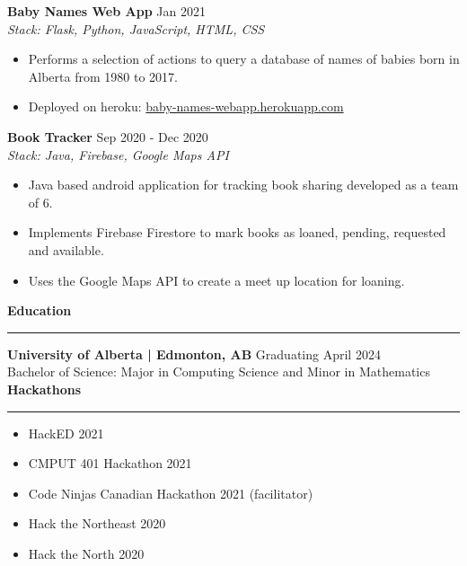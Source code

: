 \documentclass{article}
\begin{document}
\noindent \textbf {Baby Names Web App} \hfill Jan 2021 \\
\textit {Stack: Flask, Python, JavaScript, HTML, CSS}
\begin{itemize}[noitemsep, nolistsep]
	\item {Performs a selection of actions to query a database of names of babies born in Alberta from 1980 to 2017.}
	\item {Deployed on heroku: \href{https://baby-names-webapp.herokuapp.com/}{baby-names-webapp.herokuapp.com}}
\end{itemize}
\noindent \textbf {Book Tracker} \hfill Sep 2020 - Dec 2020\\
\textit {Stack: Java, Firebase, Google Maps API}
\begin{itemize}[noitemsep, nolistsep]
	\item {Java based android application for tracking book sharing developed as a team of 6.}
	\item {Implements Firebase Firestore to mark books as loaned, pending, requested and available.}
	\item {Uses the Google Maps API to create a meet up location for loaning.}
\end{itemize}
\hfill\break
\noindent \textbf {Education}
\vspace{1mm}
\hrule
\vspace{1mm}
\hfill\break
\textbf {University of Alberta | Edmonton, AB} \hfill Graduating April 2024\\
Bachelor of Science: Major in Computing Science and Minor in Mathematics
\vspace{2mm}
\hfill\break
\noindent\textbf{Hackathons}
\vspace{1mm}
\hrule
\vspace{1mm}
\begin{itemize}
	\item {HackED 2021}
	\item {CMPUT 401 Hackathon 2021}
	\item {Code Ninjas Canadian Hackathon 2021 (facilitator)}
	\item {Hack the Northeast 2020}
	\item {Hack the North 2020}
\end{itemize}
\end{document}
